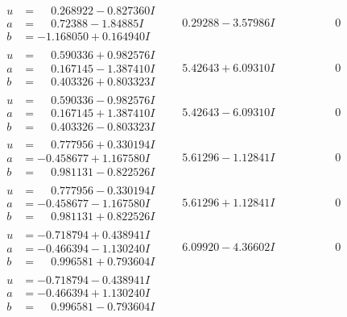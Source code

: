 \documentclass[1p]{elsarticle_modified}
\theoremstyle{definition}
\begin{document}
$$\begin{array}{c|c|c}
\begin{aligned}
u &= \phantom{-}0.268922 - 0.827360 I \\
a &= \phantom{-}0.72388 - 1.84885 I \\
b &= -1.168050 + 0.164940 I\end{aligned}
 & \phantom{-}0.29288 - 3.57986 I & \phantom{-0.000000 } 0 \\ \hline\begin{aligned}
u &= \phantom{-}0.590336 + 0.982576 I \\
a &= \phantom{-}0.167145 - 1.387410 I \\
b &= \phantom{-}0.403326 + 0.803323 I\end{aligned}
 & \phantom{-}5.42643 + 6.09310 I & \phantom{-0.000000 } 0 \\ \hline\begin{aligned}
u &= \phantom{-}0.590336 - 0.982576 I \\
a &= \phantom{-}0.167145 + 1.387410 I \\
b &= \phantom{-}0.403326 - 0.803323 I\end{aligned}
 & \phantom{-}5.42643 - 6.09310 I & \phantom{-0.000000 } 0 \\ \hline\begin{aligned}
u &= \phantom{-}0.777956 + 0.330194 I \\
a &= -0.458677 + 1.167580 I \\
b &= \phantom{-}0.981131 - 0.822526 I\end{aligned}
 & \phantom{-}5.61296 - 1.12841 I & \phantom{-0.000000 } 0 \\ \hline\begin{aligned}
u &= \phantom{-}0.777956 - 0.330194 I \\
a &= -0.458677 - 1.167580 I \\
b &= \phantom{-}0.981131 + 0.822526 I\end{aligned}
 & \phantom{-}5.61296 + 1.12841 I & \phantom{-0.000000 } 0 \\ \hline\begin{aligned}
u &= -0.718794 + 0.438941 I \\
a &= -0.466394 - 1.130240 I \\
b &= \phantom{-}0.996581 + 0.793604 I\end{aligned}
 & \phantom{-}6.09920 - 4.36602 I & \phantom{-0.000000 } 0 \\ \hline\begin{aligned}
u &= -0.718794 - 0.438941 I \\
a &= -0.466394 + 1.130240 I \\
b &= \phantom{-}0.996581 - 0.793604 I\end{aligned}

\end{array}$$
\end{document}
